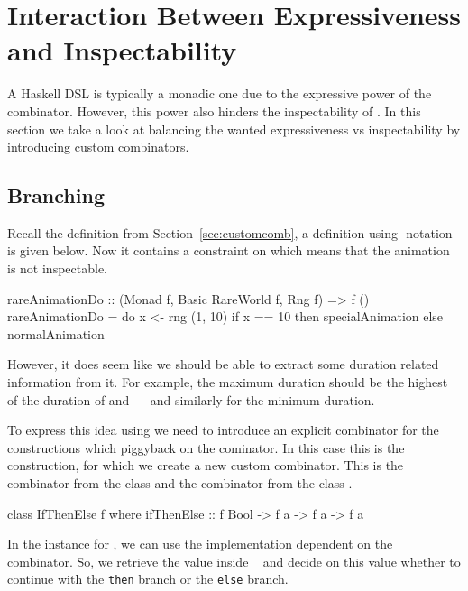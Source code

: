 \section{Interaction Between Expressiveness and Inspectability}
\label{sec:interaction}

A Haskell DSL is typically a monadic one due to the expressive power of the \hs{>>=} combinator. However, this power also hinders the inspectability of \dsl{}. In this section we take a look at balancing the wanted expressiveness vs inspectability by introducing custom combinators.

\subsection{Branching}

Recall the  definition from Section~\ref{sec:customcomb}, a definition using -notation is given below. Now it contains a  constraint on  which means that the animation is not inspectable.

\begin{code}
rareAnimationDo :: (Monad f, Basic RareWorld f, Rng f) => f ()
rareAnimationDo = do
  x <- rng (1, 10)
  if x == 10
    then specialAnimation
    else normalAnimation
\end{code}

However, it does seem like we should be able to extract some duration related information from it. For example, the maximum duration should be the highest of the duration of  and  --- and similarly for the minimum duration.

To express this idea using \dsl{} we need to introduce an explicit combinator for the constructions which piggyback on the \hs{>>=} cominator. In this case this is the  construction, for which we create a new custom combinator. This is the  combinator from the  class \cite{DBLP:phd/ethos/Yallop10} and the  combinator from the  class \cite{Mokhov:2019:SAF:3352468.3341694}.

\begin{code}
class IfThenElse f where
  ifThenElse :: f Bool -> f a -> f a -> f a
\end{code}

In the instance for , we can use the implementation dependent on the \hs{>>=} combinator. So, we retrieve the value inside ~ and decide on this value whether to continue with the \texttt{then} branch or the \texttt{else} branch.

